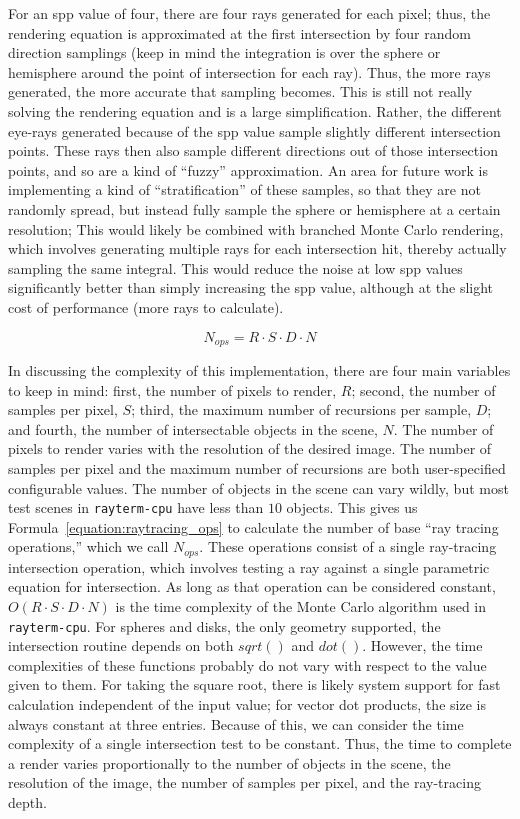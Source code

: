 For an spp value of four, there are four rays generated for each pixel; thus, the rendering equation \cite{kajiya1986rendering} is approximated at the first intersection by four random direction samplings (keep in mind the integration is over the sphere or hemisphere around the point of intersection for each ray).
Thus, the more rays generated, the more accurate that sampling becomes.
This is still not really solving the rendering equation and is a large simplification.
Rather, the different eye-rays generated because of the spp value sample slightly different intersection points.
These rays then also sample different directions out of those intersection points, and so are a kind of ``fuzzy'' approximation.
An area for future work is implementing a kind of ``stratification'' of these samples, so that they are not randomly spread, but instead fully sample the sphere or hemisphere at a certain resolution;
This would likely be combined with branched Monte Carlo rendering, which involves generating multiple rays for each intersection hit, thereby actually sampling the same integral.
This would reduce the noise at low spp values significantly better than simply increasing the spp value, although at the slight cost of performance (more rays to calculate).

\begin{equation}
\label{equation:raytracing_ops}
  N_{ops} = R \cdot S \cdot D \cdot N
\end{equation}

In discussing the complexity of this implementation, there are four main variables to keep in mind: first, the number of pixels to render, $R$; second, the number of samples per pixel, $S$; third, the maximum number of recursions per sample, $D$; and fourth, the number of intersectable objects in the scene, $N$.
The number of pixels to render varies with the resolution of the desired image.
The number of samples per pixel and the maximum number of recursions are both user-specified configurable values.
The number of objects in the scene can vary wildly, but most test scenes in \texttt{rayterm-cpu} have less than $10$ objects.
This gives us Formula~\ref{equation:raytracing_ops} to calculate the number of base ``ray tracing operations,'' which we call $N_{ops}$.
These operations consist of a single ray-tracing intersection operation, which involves testing a ray against a single parametric equation for intersection.
As long as that operation can be considered constant, $O(R \cdot S \cdot D \cdot N)$ is the time complexity of the Monte Carlo algorithm used in \texttt{rayterm-cpu}.
For spheres and disks, the only geometry supported, the intersection routine depends on both $sqrt()$ and $dot()$.
However, the time complexities of these functions probably do not vary with respect to the value given to them.
For taking the square root, there is likely system support for fast calculation independent of the input value; for vector dot products, the size is always constant at three entries.
Because of this, we can consider the time complexity of a single intersection test to be constant.
Thus, the time to complete a render varies proportionally to the number of objects in the scene, the resolution of the image, the number of samples per pixel, and the ray-tracing depth.

